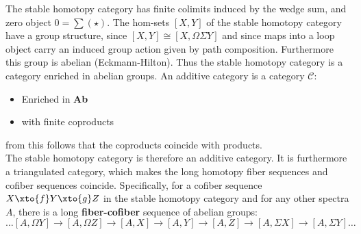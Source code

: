 The stable homotopy category has finite colimits induced by the wedge sum, and zero object $0=\sum(\star)$. The hom-sets $[X, Y]$ of the stable homotopy category have a group structure, since $[X, Y] \cong [X, \Omega \Sigma Y]$ and since maps into a loop object carry an induced group action given by path composition. Furthermore this group is abelian (Eckmann-Hilton). Thus the stable homotopy category is a category enriched in abelian groups.
An additive category is a category $\mathcal{C}$:
\begin{itemize}
\item Enriched in \textbf{Ab}
\item with finite coproducts
\end{itemize}
from this follows that the coproducts coincide with products.\\
The stable homotopy category is therefore an additive category.
It is furthermore a triangulated category, which makes the long homotopy fiber sequences and cofiber sequences coincide. Specifically, for a cofiber sequence $X \xto{f} Y \xto{g} Z$ in the stable homotopy category and for any other spectra $A$, there is a long \textbf{fiber-cofiber} sequence of abelian groups:
\[
\dots [A, \Omega Y] \to [A, \Omega Z] \to [A, X] \to [A, Y] \to [A, Z] \to [A, \Sigma X] \to [A, \Sigma Y] \dots
\]
\newpage
